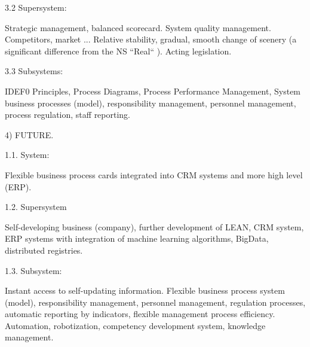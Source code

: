 \documentclass[11pt,a4paper]{book}
\begin{document}
3.2 Supersystem:

Strategic management, balanced scorecard. System quality management.
Competitors, market ... Relative stability, gradual, smooth change of scenery
(a significant difference from the NS “Real“ ). Acting legislation.

3.3 Subsystems:

IDEF0 Principles, Process Diagrams, Process Performance Management, System
business processes (model), responsibility management, personnel management,
process regulation, staff reporting.

4) FUTURE.

1.1. System:

Flexible business process cards integrated into CRM systems and more high
level (ERP).

1.2. Supersystem

Self-developing business (company), further development of LEAN, CRM system,
ERP systems with integration of machine learning algorithms, BigData,
distributed registries.

1.3. Subsystem:

Instant access to self-updating information. Flexible business process system
(model), responsibility management, personnel management, regulation
processes, automatic reporting by indicators, flexible management process
efficiency. Automation, robotization, competency development system, knowledge
management.
\end{document}
